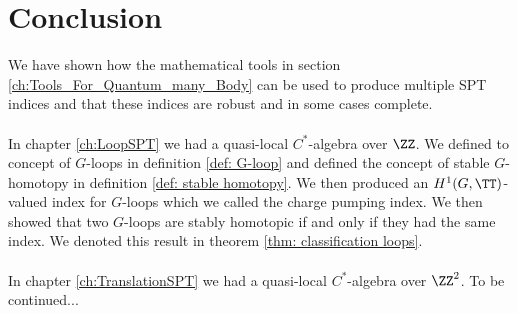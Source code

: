 \chapter{Conclusion}\label{ch:conclusion}

We have shown how the mathematical tools in section \ref{ch:Tools_For_Quantum_many_Body} can be used to produce multiple SPT indices and that these indices are robust and in some cases complete.
\\\\
In chapter \ref{ch:LoopSPT} we had a quasi-local $C^*$-algebra over $\ZZ$. We defined to concept of $G$-loops in definition \ref{def: G-loop} and defined the concept of stable $G$-homotopy in definition \ref{def: stable homotopy}. We then produced an $H^1(G,\TT)$-valued index for $G$-loops which we called the charge pumping index. We then showed that two $G$-loops are stably homotopic if and only if they had the same index. We denoted this result in theorem \ref{thm: classification loops}.
\\\\
In chapter \ref{ch:TranslationSPT} we had a quasi-local $C^*$-algebra over $\ZZ^2$. {\color{red}To be continued...}
\cleardoublepage


